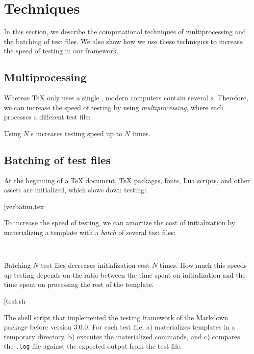 \documentclass[final]{ltugboat}
\makeatletter
\newenvironment{listing*}{\@dblfloat{listing}}{\end@dblfloat}
\newcounter{listing}
\makeatother
\begin{document}
\section{Techniques}
\label{sec:techniques}
In this section, we describe the computational techniques of multiprocessing and the batching of test files. We also show how we use these techniques to increase the speed of testing in our framework.

\subsection{Multiprocessing}
\label{sec:multiprocessing}
Whereas \TeX{} only uses a single , modern computers contain several s. Therefore, we can increase the speed of testing by using \emph{multiprocessing}, where each  processes a different test file:

\smallskip
\noindent
\begingroup
\centering

\par
\endgroup

\smallskip
\noindent
Using $N$ s increases testing speed up to $N$ times.

\subsection{Batching of test files}
\label{sec:batching-of-test-files}
At the beginning of a \TeX{} document, \TeX{} packages, fonts, Lua scripts, and other assets are initialized, which slows down testing:

\smallskip
\noindent
\example*[{verbatim.tex}

\smallskip

To increase the speed of testing, we can amortize the cost of initialization by materializing a template with a \emph{batch} of several test files:

\medskip
\noindent
{} \\

\smallskip
\noindent
Batching $N$ test files decreases initialization cost $N$ times. How much this speeds up testing depends on the ratio between the time spent on initialization and the time spent on processing the rest of the template.

\begin{listing*}
\bigExample*[{test.sh}
\caption{The shell script  that implemented the testing framework of the Markdown package before version 3.0.0. For each test file,  a) materializes templates in a temporary directory, b) executes the materialized commands, and \linebreak c) compares the \texttt{.log} file against the expected output from the test file.}
\label{lst:test.sh}
\end{listing*}
\end{document}
